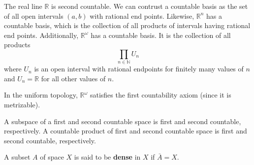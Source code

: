     \begin{example}
      The real line $\mathbb{R}$ is second countable. We can contrust a countable basis as the set of all open intervals $(a, b)$ with rational end points. Likewise, $\mathbb{R}^n$ has a countable basis, which is the collection of all products of intervals having rational end points. Additionally, $\mathbb{R}^\omega$ has a countable basis. It is the collection of all products
      \begin{equation}
        \prod_{n \in \mathbb{N}} U_n
      \end{equation}
      where $U_n$ is an open interval with rational endpoints for finitely many values of $n$ and $U_n = \mathbb{R}$ for all other values of $n$. 
    \end{example}

    \begin{example}
      In the uniform topology, $\mathbb{R}^\omega$ satisfies the first countability axiom (since it is metrizable). 
    \end{example}

    \begin{theorem}
      A subspace of a first and second countable space is first and second countable, respectively. A countable product of first and second countable space is first and second countable, respectively. 
    \end{theorem}

    \begin{theorem}
      A subset $A$ of space $X$ is said to be \textbf{dense} in $X$ if $\bar{A} = X$. 
    \end{theorem}

